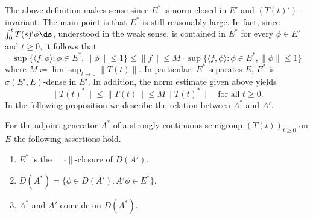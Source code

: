 The above definition makes sense since $E^{*}$ is norm-closed in $E'$ and $(T(t)')$-invariant.
The main point is that $E^{*}$ is still reasonably large.
In fact, since $\int_{0}^{t} T(s)'\phi  \ds$, understood in the weak sense, is contained in $E^{*}$ for every $\phi \in E'$ and $t \geq 0$, it follows that
\[
    \sup\{\langle f,\phi \rangle \colon \phi \in E^{*}, \|\phi\| \leq 1\} \leq \|f\| \leq M\cdot\sup\{\langle f,\phi \rangle \colon \phi \in E^{*}, \|\phi\| \leq1\}
\]
where $M \coloneqq \lim\sup_{t \to 0} \|T(t)\|$.
In particular, $E^{*}$ separates $E$, \ie $E^{*}$ is $\sigma(E',E)$-dense in $E'$.
In addition, the norm estimate given above yields
\[
    \|T(t)^{*}\| \leq \|T(t)\| \leq M\|T(t)^{*}\| \quad \text{for all } t \geq 0.
\]
In the following proposition we describe the relation between $A^{*}$ and $A'$.
\begin{proposition*}\label{prop:a1-3.4}
For the adjoint generator $A^{*}$ of a strongly continuous semigroup $(T(t))_{t \geq 0}$ on $E$ the following assertions hold.
\begin{enumerate}[\upshape(i)]
\item 
$E^{*}$ is the $\|\cdot\|$-closure of\/ $D(A')$.

\item 
$D(A^{*}) = \{\phi \in D(A') \colon A'\phi \in E^{*}\}$.

\item 
$A^{*}$ and $A'$ coincide on $D(A^{*})$.
\end{enumerate}
\end{proposition*}
